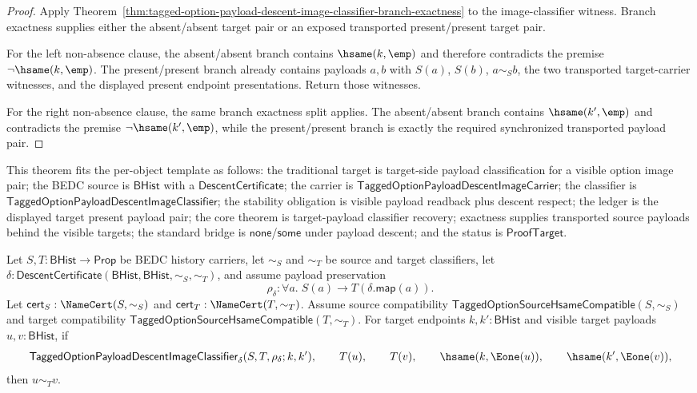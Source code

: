 \begin{proof}
Apply Theorem~\ref{thm:tagged-option-payload-descent-image-classifier-branch-exactness}
to the image-classifier witness. Branch exactness supplies either the
absent/absent target pair or an exposed transported present/present target pair.

For the left non-absence clause, the absent/absent branch contains
$\hsame(k,\emp)$ and therefore contradicts the premise $\neg\hsame(k,\emp)$.
The present/present branch already contains payloads $a,b$ with $S(a)$, $S(b)$,
$a\sim_S b$, the two transported target-carrier witnesses, and the displayed
present endpoint presentations. Return those witnesses.

For the right non-absence clause, the same branch exactness split applies. The
absent/absent branch contains $\hsame(k',\emp)$ and contradicts the premise
$\neg\hsame(k',\emp)$, while the present/present branch is exactly the required
synchronized transported payload pair.
\end{proof}
\begin{theorem}
\label{thm:tagged-option-payload-descent-image-classifier-visible-target-payload-classification}
This theorem fits the per-object template as follows: the traditional target is
target-side payload classification for a visible option image pair; the BEDC
source is $\mathsf{BHist}$ with a $\mathsf{DescentCertificate}$; the carrier is
$\mathsf{TaggedOptionPayloadDescentImageCarrier}$; the classifier is
$\mathsf{TaggedOptionPayloadDescentImageClassifier}$; the stability obligation is
visible payload readback plus descent respect; the ledger is the displayed
target present payload pair; the core theorem is target-payload classifier
recovery; exactness supplies transported source payloads behind the visible
targets; the standard bridge is $\mathsf{none}$/$\mathsf{some}$ under payload
descent; and the status is $\mathsf{ProofTarget}$.

Let $S,T:\mathsf{BHist}\to\mathsf{Prop}$ be BEDC history carriers, let
$\sim_S$ and $\sim_T$ be source and target classifiers, let
$\delta:\mathsf{DescentCertificate}(\mathsf{BHist},\mathsf{BHist},\sim_S,\sim_T)$,
and assume payload preservation
$$
\rho_{\delta}:\forall a.\;S(a)\to T(\delta.\mathsf{map}(a)).
$$
Let $\mathsf{cert}_S:\NameCert(S,\sim_S)$ and
$\mathsf{cert}_T:\NameCert(T,\sim_T)$. Assume source compatibility
$\mathsf{TaggedOptionSourceHsameCompatible}(S,\sim_S)$ and target compatibility
$\mathsf{TaggedOptionSourceHsameCompatible}(T,\sim_T)$. For target endpoints
$k,k':\mathsf{BHist}$ and visible target payloads $u,v:\mathsf{BHist}$, if
$$
\mathsf{TaggedOptionPayloadDescentImageClassifier}_{\delta}
(S,T,\rho_{\delta};k,k'),
\qquad
T(u),
\qquad
T(v),
\qquad
\hsame(k,\Eone(u)),
\qquad
\hsame(k',\Eone(v)),
$$
then $u\sim_T v$.
\end{theorem}
